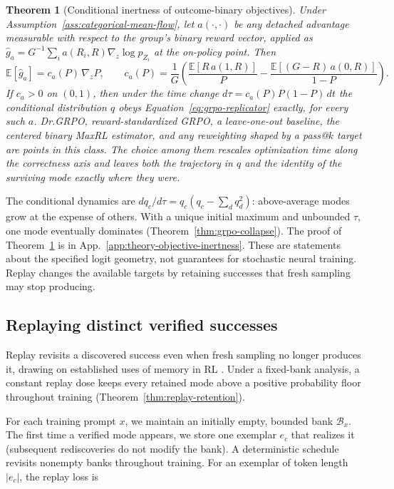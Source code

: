 \documentclass{article}
\newcommand{\1}{\mathbf 1}
\newcommand{\E}{\mathbb E}
\newtheorem{theorem}[lemma]{Theorem}
\theoremstyle{remark}
\theoremstyle{definition}
\theoremstyle{plain}
\begin{document}
\begin{theorem}[Conditional inertness of outcome-binary objectives]
\label{thm:objective-inertness}
Under Assumption~\ref{ass:categorical-mean-flow}, let $a(\cdot,\cdot)$ be any
detached advantage measurable with respect to the group's binary reward
vector, applied as
$\widehat g_a=G^{-1}\sum_{i}a(R_i,R)\nabla_z\log p_{Z_i}$ at the on-policy
point. Then
\begin{equation}
  \E[\widehat g_a]=c_a(P)\,\nabla_zP,
  \qquad
  c_a(P)=\frac1G\left(
  \frac{\E[R\,a(1,R)]}{P}-\frac{\E[(G-R)\,a(0,R)]}{1-P}\right).
  \label{eq:objective-inertness}
\end{equation}
If $c_a>0$ on $(0,1)$, then under the time change
$d\tau=c_a(P)P(1-P)\,dt$ the conditional distribution $q$ obeys
Equation~\eqref{eq:grpo-replicator} exactly, for every such $a$. Dr.GRPO,
reward-standardized GRPO, a leave-one-out baseline, the centered binary MaxRL
estimator, and any reweighting shaped by a pass@$k$ target are points in this
class. The choice among them rescales optimization time along the correctness
axis and leaves both the trajectory in $q$ and the identity of the surviving
mode exactly where they were.
\end{theorem}

The conditional dynamics are $dq_c/d\tau=q_c(q_c-\sum_dq_d^2)$: above-average modes grow at the expense of others. With a unique initial maximum and unbounded $\tau$, one mode eventually dominates (Theorem~\ref{thm:grpo-collapse}). The proof of Theorem~\ref{thm:objective-inertness} is in App.~\ref{app:theory-objective-inertness}. These are statements about the specified logit geometry, not guarantees for stochastic neural training. Replay changes the available targets by retaining successes that fresh sampling may stop producing.

\subsection{Replaying distinct verified successes}
\label{sec:replay}

Replay revisits a discovered success even when fresh sampling no longer produces it, drawing on established uses of memory in RL \citep{lin1992selfimproving,mnih2015human,rolnick2019replay}. Under a fixed-bank analysis, a constant replay dose keeps every retained mode above a positive probability floor throughout training (Theorem~\ref{thm:replay-retention}).

For each training prompt $x$, we maintain an initially empty, bounded bank
$\mathcal B_x$.
The first time a verified mode appears, we store one exemplar $e_c$ that realizes it (subsequent rediscoveries do not modify the bank).
A deterministic schedule revisits nonempty banks throughout training.
For an exemplar of token length $|e_c|$, the replay loss is
\end{document}
